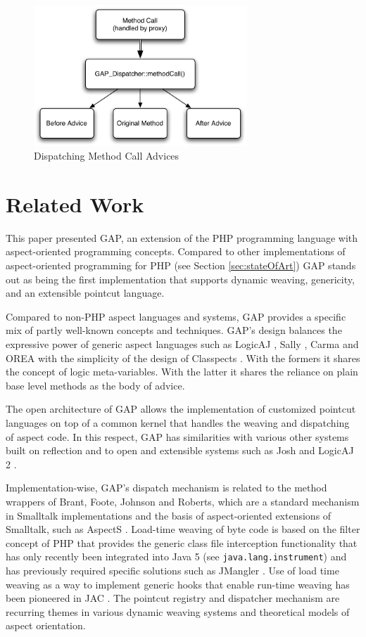 \documentclass{acm_proc_article-sp}
\begin{document}
\begin{figure}[hbt]
\centering
\includegraphics[width=8cm]{gap_dispatcher.pdf}
\caption{Dispatching Method Call Advices} \label{GAP-Dispatcher}
\end{figure}

\section{Related Work}

This paper presented GAP, an extension of the PHP programming
language with aspect-oriented programming concepts. Compared to
other implementations of aspect-oriented programming for PHP (see
Section \ref{sec:stateOfArt}) GAP stands out as being the first
implementation that supports dynamic weaving, genericity, and an
extensible pointcut language.

Compared to non-PHP aspect languages and systems, GAP provides a
specific mix of partly well-known concepts and techniques. GAP's
design balances the expressive power of generic aspect languages
such as LogicAJ \cite{windeln03}, Sally \cite{sh03}, Carma
\cite{kg03} and OREA \cite{mdh04} with the simplicity of the
design of Classpects \cite{hrkjs05}. With the formers it shares
the concept of logic meta-variables. With the latter it shares the
reliance on plain base level methods as the body of advice.

The open architecture of GAP allows the implementation of
customized pointcut languages on top of a common kernel that
handles the weaving and dispatching of aspect code. In this
respect, GAP has similarities with various other systems built on
reflection and to open and extensible systems such as Josh \cite{sckn04}
and LogicAJ 2 \cite{trgkma06}.

Implementation-wise, GAP's dispatch mechanism is related to the
method wrappers of Brant, Foote, Johnson and Roberts, which are a
standard mechanism in Smalltalk implementations and the basis of
aspect-oriented extensions of Smalltalk, such as AspectS \cite{rh01}.
Load-time weaving of byte code is based on the filter concept of PHP
that provides the generic class file interception functionality that
has only recently been integrated into Java 5 (see
\texttt{java.lang.instrument}) and has previously required specific
solutions such as JMangler \cite{gkpcma04}.
Use of load time weaving as a way to implement generic hooks that
enable run-time weaving has been pioneered in JAC \cite{rp04}. The
pointcut registry and dispatcher mechanism are recurring themes in
various dynamic weaving systems and theoretical models of aspect
orientation. %
\end{document}
